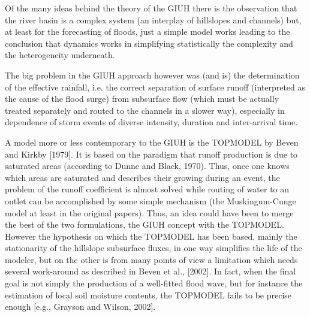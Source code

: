 Of the many ideas behind the theory of the GIUH there is the observation that the river basin is a complex system (an interplay of hillslopes and channels) but, at least for the forecasting of floods, just a simple model works leading to the conclusion that dynamics works in simplifying  statistically the complexity and the heterogeneity underneath.

The big problem in the GIUH approach however was (and is) the determination of the effective rainfall, i.e. the correct separation of surface runoff (interpreted as the cause of the flood surge) from subsurface flow (which must be actually treated separately and routed to the channels in a slower way), especially in dependence of storm events of diverse intensity, duration and inter-arrival time. 

A model more or less contemporary to the GIUH is the TOPMODEL by Beven and Kirkby [1979]. It is based on the paradigm that runoff production is due to saturated areas (according to Dunne and Black, 1970). Thus, once one knows which areas are saturated and describes their growing during an event, the problem of the runoff coefficient is almost solved while routing of water to an outlet can be accomplished by some simple mechanism (the Muskingum-Cunge model at least in the original papers). 
Thus, an idea could have been to merge the best of the two formulations, the GIUH concept with the TOPMODEL. However the hypothesis on which the TOPMODEL has been based, mainly the stationarity of the hillslope subsurface fluxes,  in one way simplifies the life of the modeler, but on the other is from many points of view a limitation which needs several work-around as described in  Beven et al., [2002]. In fact, when the final goal is not simply the production of a well-fitted flood wave, but for instance the estimation of local soil moisture contents, the TOPMODEL fails to be precise enough [e.g., Grayson and Wilson, 2002]. 

